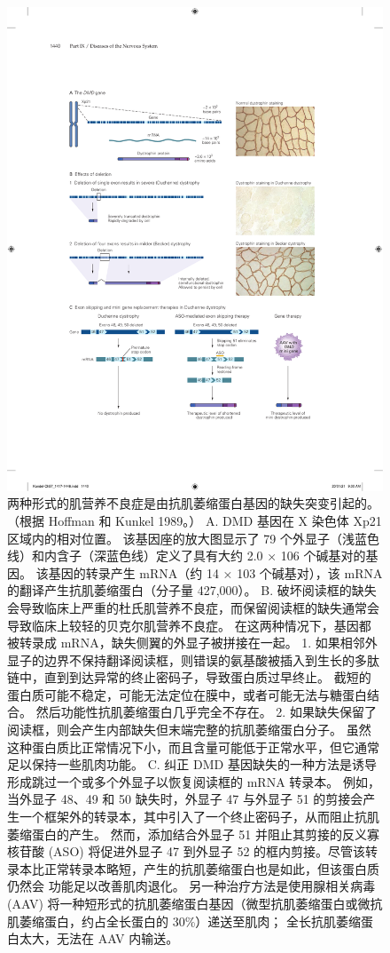 \begin{figure}[htbp]
	\centering
	\includegraphics[width=0.9\linewidth]{chap57/fig_57_10}
	\caption{两种形式的肌营养不良症是由抗肌萎缩蛋白基因的缺失突变引起的。 （根据 Hoffman 和 Kunkel 1989。） A. DMD 基因在 X 染色体 Xp21 区域内的相对位置。 该基因座的放大图显示了 79 个外显子（浅蓝色线）和内含子（深蓝色线）定义了具有大约 2.0 × 106 个碱基对的基因。 该基因的转录产生 mRNA（约 14 × 103 个碱基对），该 mRNA 的翻译产生抗肌萎缩蛋白（分子量 427,000）。 B. 破坏阅读框的缺失会导致临床上严重的杜氏肌营养不良症，而保留阅读框的缺失通常会导致临床上较轻的贝克尔肌营养不良症。 在这两种情况下，基因都被转录成 mRNA，缺失侧翼的外显子被拼接在一起。 1. 如果相邻外显子的边界不保持翻译阅读框，则错误的氨基酸被插入到生长的多肽链中，直到到达异常的终止密码子，导致蛋白质过早终止。 截短的蛋白质可能不稳定，可能无法定位在膜中，或者可能无法与糖蛋白结合。 然后功能性抗肌萎缩蛋白几乎完全不存在。 2. 如果缺失保留了阅读框，则会产生内部缺失但末端完整的抗肌萎缩蛋白分子。 虽然这种蛋白质比正常情况下小，而且含量可能低于正常水平，但它通常足以保持一些肌肉功能。 C. 纠正 DMD 基因缺失的一种方法是诱导形成跳过一个或多个外显子以恢复阅读框的 mRNA 转录本。 例如，当外显子 48、49 和 50 缺失时，外显子 47 与外显子 51 的剪接会产生一个框架外的转录本，其中引入了一个终止密码子，从而阻止抗肌萎缩蛋白的产生。 然而，添加结合外显子 51 并阻止其剪接的反义寡核苷酸 (ASO) 将促进外显子 47 到外显子 52 的框内剪接。尽管该转录本比正常转录本略短，产生的抗肌萎缩蛋白也是如此，但该蛋白质仍然会 功能足以改善肌肉退化。 另一种治疗方法是使用腺相关病毒 (AAV) 将一种短形式的抗肌萎缩蛋白基因（微型抗肌萎缩蛋白或微抗肌萎缩蛋白，约占全长蛋白的 30\%）递送至肌肉； 全长抗肌萎缩蛋白太大，无法在 AAV 内输送。}
	\label{fig:57_10}
\end{figure}

